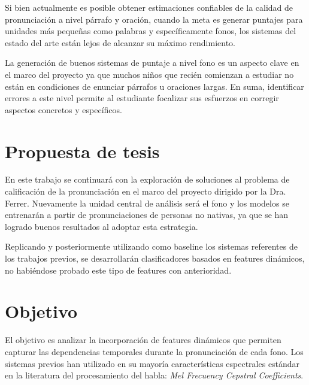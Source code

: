 \documentclass[a4paper,12pt]{article} %
\begin{document}
Si bien actualmente es posible obtener estimaciones confiables de la calidad
de pronunciación a nivel párrafo y oración, cuando la meta es generar puntajes 
para unidades más pequeñas como palabras y específicamente fonos, los sistemas del
estado del arte están lejos de alcanzar su máximo rendimiento.

La generación de buenos sistemas de puntaje a nivel fono es un aspecto clave en el marco del
proyecto ya que muchos niños que recién comienzan a estudiar no están en condiciones
de enunciar párrafos u oraciones largas. En suma, identificar errores a este
nivel permite al estudiante focalizar sus esfuerzos en corregir aspectos concretos
y específicos.


\section{Propuesta de tesis}

En este trabajo se continuará con la exploración de soluciones al problema de calificación
de la pronunciación en el marco del proyecto dirigido por la Dra. Ferrer. Nuevamente 
la unidad central de análisis será el fono y los modelos se entrenarán 
a partir de pronunciaciones de personas no nativas, ya que se han logrado buenos resultados al adoptar esta estrategia. 

Replicando y posteriormente utilizando como baseline los sistemas referentes de los trabajos
previos, se desarrollarán clasificadores basados en features dinámicos, no habiéndose 
probado este tipo de features con anterioridad.


\section{Objetivo}

El objetivo es analizar la incorporación de features dinámicos que permiten capturar
las dependencias temporales durante la pronunciación de cada fono.
Los sistemas previos han utilizado en su mayoría características espectrales estándar
en la literatura del procesamiento del habla: \textit{Mel Frecuency Cepstral 
Coefficients}.
\end{document}
